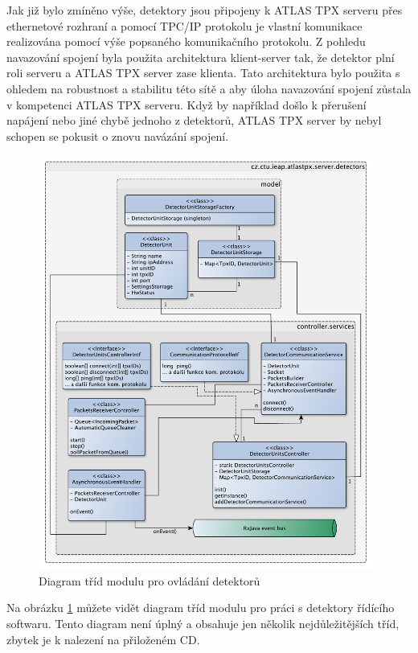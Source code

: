 Jak již bylo zmíněno výše, detektory jsou připojeny k ATLAS TPX serveru přes ethernetové rozhraní a pomocí TPC/IP protokolu je vlastní komunikace realizována pomocí výše popsaného komunikačního protokolu. Z pohledu navazování spojení byla použita architektura klient-server tak, že detektor plní roli serveru a ATLAS TPX server zase klienta. Tato architektura bylo použita s ohledem na robustnost a stabilitu této sítě a aby úloha navazování spojení zůstala v kompetenci ATLAS TPX serveru. Když by například došlo k přerušení napájení nebo jiné chybě jednoho z detektorů, ATLAS TPX server by nebyl schopen se pokusit o znovu navázání spojení.

\begin{figure}[th]
	\begin{center}
		\includegraphics[width=11cm]{figures/atlas_tpx_detectors_class.pdf}
		\caption{Diagram tříd modulu pro ovládání detektorů}
		\label{fig:class:detectors}
	\end{center}
\end{figure}

Na obrázku \ref{fig:class:detectors} můžete vidět diagram tříd modulu pro práci s detektory řídícího softwaru. Tento diagram není úplný a obsahuje jen několik nejdůležitějších tříd, zbytek je k nalezení na přiloženém CD.

